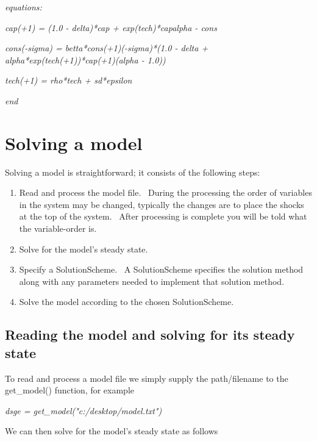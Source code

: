 \documentclass[notitlepage,11pt]{article}
\begin{document}
\textit{\bigskip }

\textit{equations:}

\textit{cap(+1) = (1.0 - delta)*cap + exp(tech)*capalpha - cons}

\textit{cons(-sigma) = betta*cons(+1)(-sigma)*(1.0 -
delta + alpha*exp(tech(+1))*cap(+1)(alpha - 1.0))}

\textit{tech(+1) = rho*tech + sd*epsilon}

\textit{end}

\section{Solving a model}

Solving a model is straightforward; it consists of the following steps:

\begin{enumerate}
\item Read and process the model file. \ During the processing the order of
variables in the system may be changed, typically the changes are to place
the shocks at the top of the system. \ After processing is complete you will
be told what the variable-order is.

\item Solve for the model's steady state.

\item Specify a SolutionScheme. \ A SolutionScheme specifies the solution
method along with any parameters needed to implement that solution method.

\item Solve the model according to the chosen SolutionScheme.
\end{enumerate}

\subsection{Reading the model and solving for its steady state}

To read and process a model file we simply supply the path/filename to the
get\_model() function, for example

\bigskip

\textit{dsge = get\_model("c:/desktop/model.txt")}

\bigskip

We can then solve for the model's steady state as follows

\bigskip
\end{document}

